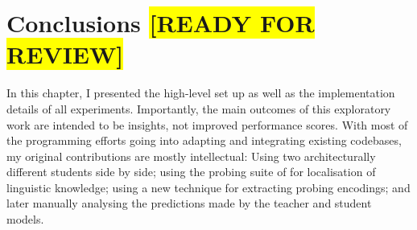 \documentclass[bsc,frontabs,twoside,singlespacing,parskip,deptreport]{infthesis}
\def\reviewready{\colorbox{yellow}{[READY FOR REVIEW]}}
\begin{document}
{  \section{Conclusions \reviewready}{
    In this chapter, I presented the high-level set up as well as the implementation details of all experiments.
    Importantly, the main outcomes of this exploratory work are intended to be insights, not improved performance scores.
    With most of the programming efforts going into adapting and integrating existing codebases, my original contributions are mostly intellectual: 
    Using two architecturally different students side by side; 
    using the probing suite of \citet{Conneau_2018} for localisation of linguistic knowledge;
    using a new technique for extracting probing encodings; 
    and later manually analysing the predictions made by the teacher and student models.
  }
}
\end{document}
